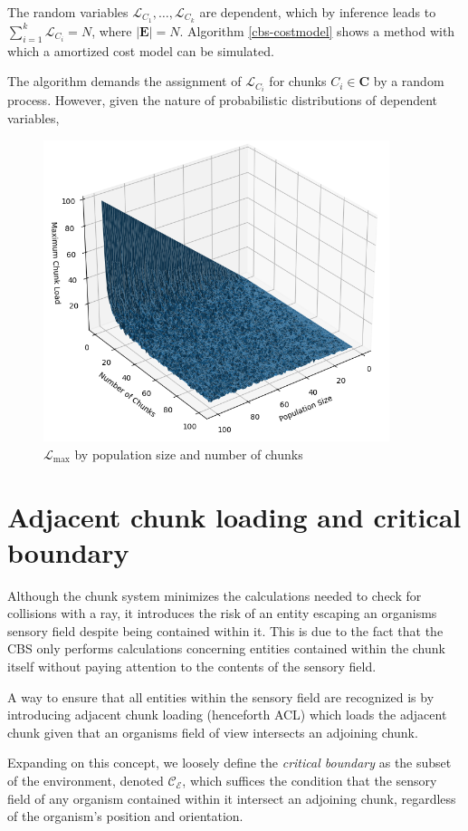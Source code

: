 \documentclass[a4paper, 12pt]{report}
\theoremstyle{definition}
\begin{document}
\noindent The random variables $\mathcal L_{C_1}, \ldots, \mathcal L_{C_k}$ are dependent, which by inference leads to $\sum_{i = 1}^k \mathcal L_{C_i} = N$, where $|\mathbf E| = N$. Algorithm \ref*{cbs-costmodel} shows a method with which a amortized cost model can be simulated.
\par The algorithm demands the assignment of $\mathcal L_{C_i}$ for chunks $C_i \in \mathbf C$ by a random process. However, given the nature of probabilistic distributions of dependent variables, 
\begin{figure}[ht!]
    \centering
    \includegraphics[width=0.9\textwidth]{img/mcl_simulation.png}
    \caption{$\mathcal L_{\max}$ by population size and number of chunks}
\end{figure}

\section{Adjacent chunk loading and critical boundary}
Although the chunk system minimizes the calculations needed to check for collisions with a ray, it introduces the risk of an entity
escaping an organisms sensory field despite being contained within it. This is due to the fact that the CBS only performs calculations
concerning entities contained within the chunk itself without paying attention to the contents of the sensory field.
\par A way to ensure that all entities within the sensory field are recognized is by introducing adjacent chunk loading (henceforth ACL)
which loads the adjacent chunk given that an organisms field of view intersects an adjoining chunk.
\par Expanding on this concept, we loosely define the \emph{critical boundary} as the subset of the environment, denoted $\mathcal C_{\mathscr E}$,
which suffices the condition that the sensory field of any organism contained within it intersect an adjoining chunk, regardless of the organism's position
and orientation.
\end{document}
